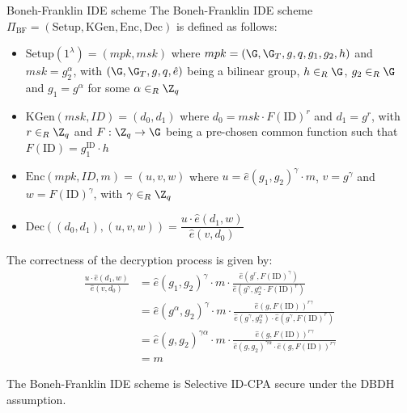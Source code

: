 \documentclass[a4paper, 12pt]{report}
\begin{document}
    \begin{framedalgo}{Boneh-Franklin IDE scheme}
        The Boneh-Franklin IDE scheme $\Pi_{\text{BF}} = (\mathrm{Setup}, \mathrm{KGen}, \mathrm{Enc}, \mathrm{Dec})$ is defined as follows:
        \begin{itemize}
            \item $\mathrm{Setup}(1^\lambda) = (mpk, msk)$ where $mpk = (\G, \G_T, g, q, g_1, g_2, h)$ and $msk = g_2^\alpha$, with $(\G,\G_T, g,q,\hat e)$ being a bilinear group, $h \in_R \G$, $g_2 \in_R \G$ and $g_1 = g^\alpha$ for some $\alpha \in_R \Z_q$ 
            \item $\mathrm{KGen}(msk, ID) = (d_0, d_1)$ where $d_0 = msk \cdot F(\mathrm{ID})^r$ and $d_1 = g^r$, with $r \in_R \Z_q$ and $F : \Z_q \to \G$ being a pre-chosen common function such that $F(\mathrm{ID}) = g_1^{\mathrm{ID}} \cdot h$
            \item $\mathrm{Enc}(mpk, ID, m) = (u,v,w)$ where $u = \hat e(g_1, g_2)^\gamma \cdot m$, $v = g^\gamma$ and $w = F(\mathrm{ID})^\gamma$, with $\gamma \in_R \Z_q$
            \item $\mathrm{Dec}((d_0, d_1), (u,v,w)) = \dfrac{u \cdot \hat e (d_1, w)}{\hat e (v, d_0)}$
        \end{itemize}
    \end{framedalgo}

    The correctness of the decryption process is given by:
    \[\begin{split}
        \frac{u \cdot \hat e (d_1, w)}{\hat e (v, d_0)} &= \hat e(g_1, g_2)^\gamma \cdot m \cdot \frac{\hat e (g^r, F(\mathrm{ID})^\gamma)}{\hat e (g^\gamma, g_2^\alpha \cdot F(\mathrm{ID})^r)} \\
        &=  \hat e(g^\alpha, g_2)^\gamma \cdot m \cdot \frac{\hat e (g, F(\mathrm{ID}))^{r\gamma}}{\hat e (g^\gamma, g_2^\alpha) \cdot \hat e(g^\gamma, F(\mathrm{ID})^r)} \\
        &=  \hat e(g, g_2)^{\gamma\alpha} \cdot m \cdot \frac{\hat e (g, F(\mathrm{ID}))^{r\gamma}}{\hat e (g, g_2)^{\gamma\alpha} \cdot \hat e(g, F(\mathrm{ID}))^{r\gamma}} \\
        &= m
    \end{split}\]


    \begin{framedthm}{}
        The Boneh-Franklin IDE scheme is Selective ID-CPA secure under the DBDH assumption.
    \end{framedthm}
    
\end{document}
